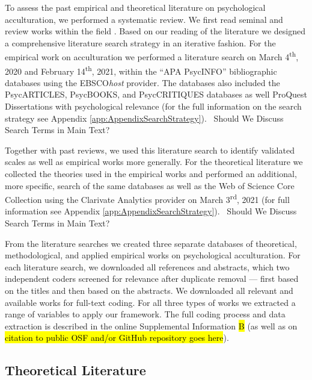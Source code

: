 \newcommand{\nTheo}{92}
\newcommand{\nMeth}{221}
\newcommand{\nEmp}{526}

To assess the past empirical and theoretical literature on psychological
acculturation, we performed a systematic review. We first read seminal
and review works within the field
\citep[including,][]{Ward2019, Berry1997b, Berry2003, Szapocznik1978, Sam2006a, Rudmin2003a}.
Based on our reading of the literature we designed a comprehensive
literature search strategy in an iterative fashion. For the empirical
work on acculturation we performed a literature search on March
4\textsuperscript{th}, 2020 and February 14\textsuperscript{th}, 2021,
within the ``APA PsycINFO'' bibliographic databases using the
EBSCO\textit{host} provider. The databases also included the
PsycARTICLES, PsycBOOKS, and PsycCRITIQUES databases as well ProQuest
Dissertations with psychological relevance (for the full information on
the search strategy see Appendix \ref{app:AppendixSearchStrategy}).
\Warning~Should We Discuss Search Terms in Main Text? \Warning

Together with past reviews, we used this literature search to identify
validated scales as well as empirical works more generally. For the
theoretical literature we collected the theories used in the empirical
works and performed an additional, more specific, search of the same
databases as well as the Web of Science Core Collection using the
Clarivate Analytics provider on March 3\textsuperscript{rd}, 2021 (for
full information see Appendix \ref{app:AppendixSearchStrategy}).
\Warning~Should We Discuss Search Terms in Main Text? \Warning~

From the literature searches we created three separate databases of
theoretical, methodological, and applied empirical works on
psychological acculturation. For each literature search, we downloaded
all references and abstracts, which two independent coders screened for
relevance after duplicate removal --- first based on the titles and then
based on the abstracts. We downloaded all relevant and available works
for full-text coding. For all three types of works we extracted a range
of variables to apply our framework. The full coding process and data
extraction is described in the online Supplemental Information \hl{B}
(as well as on
\hl{citation to public OSF and/or GitHub repository goes here}).

\subsection{Theoretical Literature}

